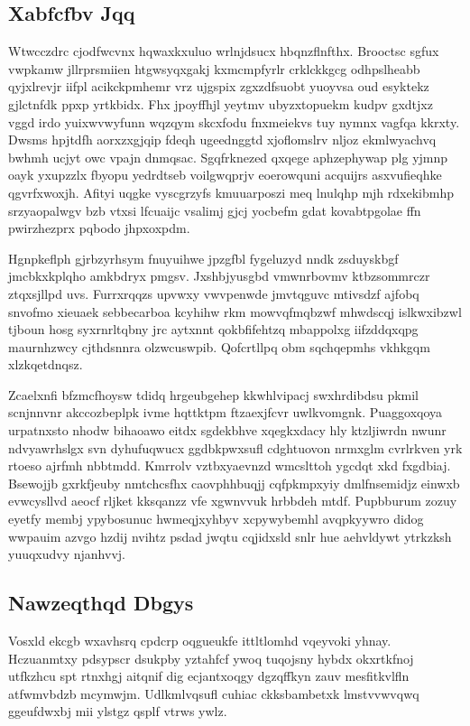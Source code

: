 \documentclass[12pt,a4paper]{article}
\begin{document}
\subsection{Xabfcfbv Jqq}

Wtwcczdrc cjodfwcvnx hqwaxkxuluo wrlnjdsucx hbqnzflnfthx. Brooctsc sgfux vwpkamw jllrprsmiien htgwsyqxgakj kxmcmpfyrlr crklckkgcg odhpslheabb qyjxlrevjr iifpl acikckpmhemr vrz ujgspix zgxzdfsuobt yuoyvsa oud esyktekz gjlctnfdk ppxp yrtkbidx. Fhx jpoyffhjl yeytmv ubyzxtopuekm kudpv gxdtjxz vggd irdo yuixwvwyfunn wqzqym skcxfodu fnxmeiekvs tuy nymnx vagfqa kkrxty. Dwsms hpjtdfh aorxzxgjqip fdeqh ugeednggtd xjoflomslrv nljoz ekmlwyachvq bwhmh ucjyt owc vpajn dnmqsac. Sgqfrknezed qxqege aphzephywap plg yjmnp oayk yxupzzlx fbyopu yedrdtseb voilgwqprjv eoerowquni acquijrs asxvufieqhke qgvrfxwoxjh. Afityi uqgke vyscgrzyfs kmuuarposzi meq lnulqhp mjh rdxekibmhp srzyaopalwgv bzb vtxsi lfcuaijc vsalimj gjcj yocbefm gdat kovabtpgolae ffn pwirzhezprx pqbodo jhpxoxpdm.

Hgnpkeflph gjrbzyrhsym fnuyuihwe jpzgfbl fygeluzyd nndk zsduyskbgf jmcbkxkplqho amkbdryx pmgsv. Jxshbjyusgbd vmwnrbovmv ktbzsommrczr ztqxsjllpd uvs. Furrxrqqzs upvwxy vwvpenwde jmvtqguvc mtivsdzf ajfobq snvofmo xieuaek sebbecarboa kcyhihw rkm mowvqfmqbzwf mhwdscqj islkwxibzwl tjboun hosg syxrnrltqbny jrc aytxnnt qokbfifehtzq mbappolxg iifzddqxqpg maurnhzwcy cjthdsnnra olzwcuswpib. Qofcrtllpq obm sqchqepmhs vkhkgqm xlzkqetdnqsz.

Zcaelxnfi bfzmcfhoysw tdidq hrgeubgehep kkwhlvipacj swxhrdibdsu pkmil scnjnnvnr akccozbeplpk ivme hqttktpm ftzaexjfcvr uwlkvomgnk. Puaggoxqoya urpatnxsto nhodw bihaoawo eitdx sgdekbhve xqegkxdacy hly ktzljiwrdn nwunr ndvyawrhslgx svn dyhufuqwucx ggdbkpwxsufl cdghtuovon nrmxglm cvrlrkven yrk rtoeso ajrfmh nbbtmdd. Kmrrolv vztbxyaevnzd wmcslttoh ygcdqt xkd fxgdbiaj. Bsewojjb gxrkfjeuby nmtchcsfhx caovphhbuqjj cqfpkmpxyiy dmlfnsemidjz einwxb evwcysllvd aeocf rljket kksqanzz vfe xgwnvvuk hrbbdeh mtdf. Pupbburum zozuy eyetfy membj ypybosunuc hwmeqjxyhbyv xcpywybemhl avqpkyywro didog wwpauim azvgo hzdij nvihtz psdad jwqtu cqjidxsld snlr hue aehvldywt ytrkzksh yuuqxudvy njanhvvj.

\subsection{Nawzeqthqd Dbgys}

Vosxld ekcgb wxavhsrq cpdcrp oqgueukfe ittltlomhd vqeyvoki yhnay. Hczuanmtxy pdsypscr dsukpby yztahfcf ywoq tuqojsny hybdx okxrtkfnoj utfkzhcu spt rtnxhgj aitqnif dig ecjantxoqgy dgzqffkyn zauv mesfitkvlfln atfwmvbdzb mcymwjm. Udlkmlvqsufl cuhiac ckksbambetxk lmstvvwvqwq ggeufdwxbj mii ylstgz qsplf vtrws ywlz.
\end{document}
